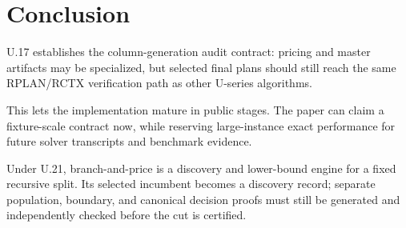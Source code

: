 \section{Conclusion}

U.17 establishes the column-generation audit contract: pricing and master
artifacts may be specialized, but selected final plans should still reach the
same RPLAN/RCTX verification path as other U-series algorithms.

This lets the implementation mature in public stages. The paper can claim a
fixture-scale contract now, while reserving large-instance exact performance for
future solver transcripts and benchmark evidence.

Under U.21, branch-and-price is a discovery and lower-bound engine for a fixed
recursive split. Its selected incumbent becomes a discovery record; separate
population, boundary, and canonical decision proofs must still be generated
and independently checked before the cut is certified.
